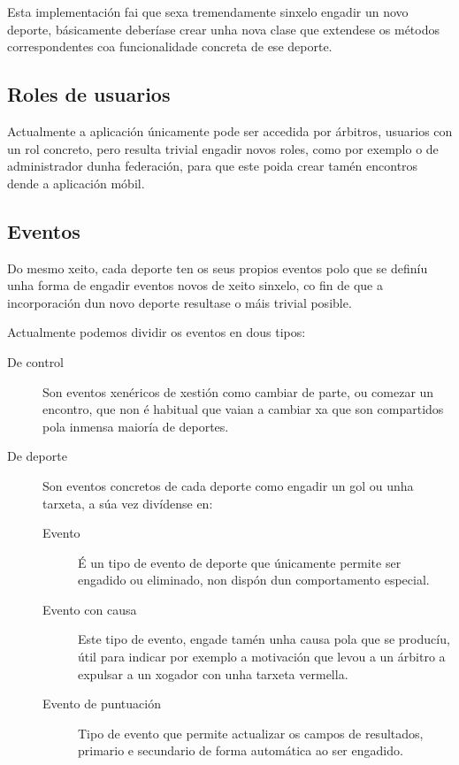   Esta implementación fai que sexa tremendamente sinxelo engadir un novo 
deporte, básicamente deberíase crear unha nova clase que extendese os métodos 
correspondentes coa funcionalidade concreta de ese deporte.

  \subsection{Roles de usuarios}
  Actualmente a aplicación únicamente pode ser accedida por árbitros, usuarios 
con un rol concreto, pero resulta trivial engadir novos roles, como por exemplo 
o de administrador dunha federación, para que este poida crear tamén 
encontros dende a aplicación móbil.


  \subsection{Eventos}
  Do mesmo xeito, cada deporte ten os seus propios eventos polo que se definíu 
unha forma de engadir eventos novos de xeito sinxelo, co fin de que a 
incorporación dun novo deporte resultase o máis trivial posible.

  Actualmente podemos dividir os eventos en dous tipos:

  \begin{description}
    \item [De control] Son eventos xenéricos de xestión como cambiar de parte, 
ou comezar un encontro, que non é habitual que vaian a cambiar xa que son 
compartidos pola inmensa maioría de deportes.
    \item [De deporte] Son eventos concretos de cada deporte como engadir un gol 
ou unha tarxeta, a súa vez divídense en:
      \begin{description}
       \item [Evento] É un tipo de evento de deporte que únicamente permite ser 
engadido ou eliminado, non dispón dun comportamento especial.
       \item [Evento con causa] Este tipo de evento, engade tamén unha causa 
pola que se producíu, útil para indicar por exemplo a motivación que levou a 
un árbitro a expulsar a un xogador con unha tarxeta vermella.
         \item [Evento de puntuación] Tipo de evento que permite actualizar os 
campos de resultados, primario e secundario de forma automática ao ser engadido.
      \end{description}

  \end{description}

